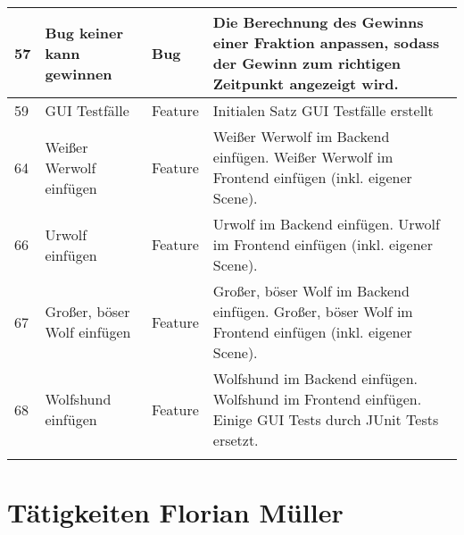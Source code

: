 \begin{tabularx}{\textwidth}{|l|p{4.5cm}|l|X|}
	57 \label{iss:57}	&	Bug keiner kann gewinnen	&	Bug	&	Die Berechnung des Gewinns einer Fraktion anpassen, sodass der Gewinn zum richtigen Zeitpunkt angezeigt wird.   \\ \hline
	59 \label{iss:59}	&	GUI Testfälle	&	Feature	&	Initialen Satz GUI Testfälle erstellt  \\ \hline
	64 \label{iss:64}	&	Weißer Werwolf einfügen	&	Feature	&	Weißer Werwolf im Backend einfügen. Weißer Werwolf im Frontend einfügen (inkl. eigener Scene).   \\ \hline
	66 \label{iss:66}	&	Urwolf einfügen	&	Feature	&	Urwolf im Backend einfügen. Urwolf im Frontend einfügen (inkl. eigener Scene).   \\ \hline
	67 \label{iss:67}	&	Großer, böser Wolf einfügen	&	Feature	&	Großer, böser Wolf im Backend einfügen. Großer, böser Wolf im Frontend einfügen (inkl. eigener Scene).   \\ \hline
	68 \label{iss:68}	&	Wolfshund einfügen	&	Feature	&	Wolfshund im Backend einfügen. Wolfshund im Frontend einfügen. Einige GUI Tests durch JUnit Tests ersetzt.   \\ \hline
\caption{Tätigkeiten Henrik Möhlmann}\label{tbl:henrik}
\end{tabularx}

\newpage
\section{Tätigkeiten Florian Müller}

